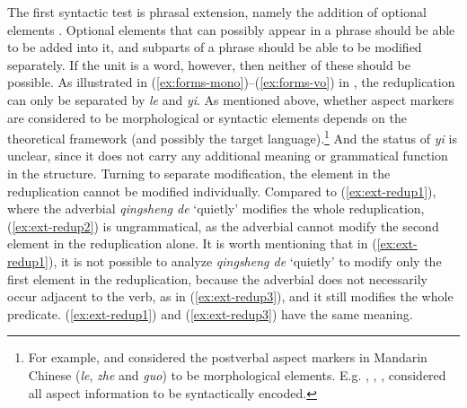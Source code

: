 The first syntactic test is phrasal extension, namely the addition of optional elements \citetext{\citealp[150]{Duanmu1998}; \citealp[280]{Schaefer2009}}. 
Optional elements that can possibly appear in a phrase should be able to be added into it,
and subparts of a phrase should be able to be modified separately. 
If the unit is a word, however, then neither of these should  be possible.
As illustrated in (\ref{ex:forms-mono})--(\ref{ex:forms-vo}) in , the reduplication can only be separated by \textit{le} and \textit{yi}. 
As mentioned above, whether aspect markers are considered to be morphological or syntactic elements depends on the theoretical framework (and possibly the target language).\footnote{For example, \citet[Sec. 3.3.1]{Huangetal2009} and \citet[246]{MuellerLipenkova2013} considered the postverbal aspect markers  in Mandarin Chinese (\textit{le}, \textit{zhe} and \textit{guo}) to be morphological elements. E.g. \citet{Travis2000}, \citet{Ramchand2008},  \citet[23]{Arcodiaetal2014}, \citet[146]{BascianoMelloni2017} considered all aspect information to be syntactically encoded.} 
And the status of \textit{yi} is unclear, since it does not carry any additional meaning or grammatical function in the structure. %
Turning to separate modification,  the element in the reduplication cannot be modified individually. 
Compared to (\ref{ex:ext-redup1}), where the adverbial \textit{qingsheng de} `quietly' modifies the whole reduplication, (\ref{ex:ext-redup2}) is ungrammatical, 
as the adverbial cannot modify the second element in the reduplication alone.
It is worth mentioning that in (\ref{ex:ext-redup1}), it is not possible to analyze \textit{qingsheng de} `quietly' to modify only the first element in the reduplication, 
because the adverbial does not necessarily occur adjacent to the verb, as in (\ref{ex:ext-redup3}), 
and it still modifies the whole predicate.
(\ref{ex:ext-redup1}) and  (\ref{ex:ext-redup3}) have the same meaning.

\ea
  
  

